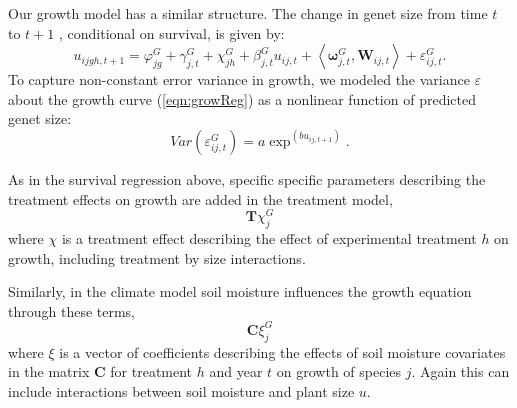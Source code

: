 \documentclass[11pt]{article}
\begin{document}
\begin{doublespacing}
Our growth model has a similar structure. The change in genet size from time $t$ to $t+1$ , conditional on survival, is given by:
\begin{equation}
u_{ijgh,t+1} = \varphi_{jg}^G + \gamma_{j,t}^G + \chi_{jh}^G  + \beta_{j,t}^G u_{ij,t} + 
\left \langle  \boldsymbol{\omega}_{j,t}^G, \boldsymbol{W}_{ij,t} \right \rangle + \varepsilon_{ij,t}^G .
\label{eqn:growReg}
\end{equation}
To capture non-constant error variance in growth, we modeled the variance $\varepsilon$  about the growth curve (\ref{eqn:growReg})  as a nonlinear function of predicted genet size:
\begin{equation}
Var(\varepsilon_{ij,t}^G) = a \exp ^{(bu_{ij,t+1})} .
\label{eqn:growVar}
\end{equation}

As in the survival regression above, specific specific parameters describing the treatment effects on growth are added in the treatment model, 
\begin{equation}
\boldsymbol{T} \chi_{j}^G 
\label{eqn:growT}
\end{equation}
where $\chi$ is a treatment effect describing the effect of experimental treatment $h$ on growth, including treatment by size interactions.

Similarly, in the climate model soil moisture influences the growth equation through these terms,  
\begin{equation}
\boldsymbol{C}\xi_{j}^G 
\label{eqn:growC}
\end{equation}
where $\xi$ is a vector of coefficients describing the effects of soil moisture covariates in the matrix $\boldsymbol{C}$ for treatment $h$ and year $t$ on growth of species $j$. Again this can include interactions between soil moisture and plant size $u$.


\end{doublespacing}
\end{document}
